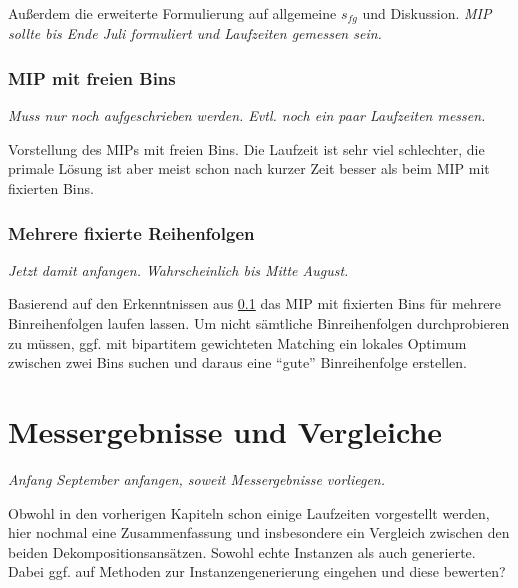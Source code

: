 \documentclass{scrreprt}
\begin{document}
Außerdem die erweiterte Formulierung auf allgemeine $s_{fg}$ und Diskussion.
\textit{MIP sollte bis Ende Juli formuliert und Laufzeiten gemessen sein.}

\subsection{MIP mit freien Bins}
\label{subsec:mipfreibins}
\textit{Muss nur noch aufgeschrieben werden. Evtl. noch ein paar Laufzeiten messen.}

Vorstellung des MIPs mit freien Bins. 
Die Laufzeit ist sehr viel schlechter, die primale Lösung ist aber meist schon nach kurzer Zeit besser als beim MIP mit fixierten Bins.

\subsection{Mehrere fixierte Reihenfolgen}
\textit{Jetzt damit anfangen. Wahrscheinlich bis Mitte August.}

Basierend auf den Erkenntnissen aus \ref{subsec:mipfreibins} das MIP mit fixierten Bins für mehrere Binreihenfolgen laufen lassen.
Um nicht sämtliche Binreihenfolgen durchprobieren zu müssen,
ggf. mit bipartitem gewichteten Matching ein lokales Optimum zwischen zwei Bins suchen und daraus eine "`gute"' Binreihenfolge erstellen.


\chapter{Messergebnisse und Vergleiche}
\textit{Anfang September anfangen, soweit Messergebnisse vorliegen.}

Obwohl in den vorherigen Kapiteln schon einige Laufzeiten vorgestellt werden, hier nochmal eine Zusammenfassung und insbesondere ein Vergleich
zwischen den beiden Dekompositionsansätzen. Sowohl echte Instanzen als auch generierte. 
Dabei ggf. auf Methoden zur Instanzengenerierung eingehen und diese bewerten?
\end{document}
